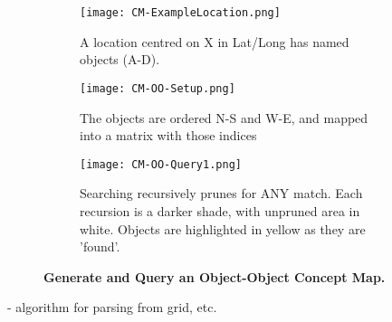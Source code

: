 \begin{figure*}[h]
    \centering
    
    \begin{subfigure}[t]{.3\textwidth}
        \texttt{[image: CM-ExampleLocation.png]}
        \caption{\small A location centred on X in Lat/Long has named objects (A-D).} %
        \label{fig:CM-Example}
    \end{subfigure}
    \hfill
    \begin{subfigure}[t]{.3\textwidth}
        \texttt{[image: CM-OO-Setup.png]}
        \caption{\small The objects are ordered N-S and W-E, and mapped into a matrix with those indices} %
        \label{fig:CM-OO-Setup}
    \end{subfigure}
    \hfill
        \begin{subfigure}[t]{.3\textwidth}
        \texttt{[image: CM-OO-Query1.png]}
        \caption{\small Searching recursively prunes for ANY match. Each recursion is a darker shade, with unpruned area in white. Objects are highlighted in yellow as they are 'found'.}%
        \label{fig:CM-OO-Query}
    \hfill
    \end{subfigure}
    \caption{\textbf{Generate and Query an Object-Object Concept Map.}} 
\end{figure*}
- algorithm for parsing from grid, etc.


